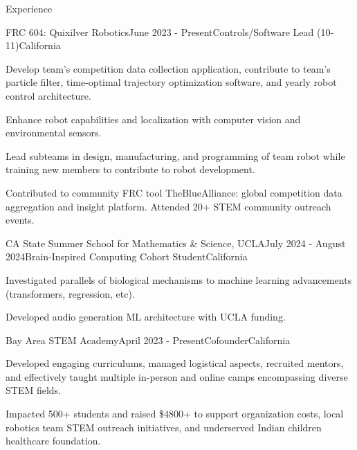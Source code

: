 \documentclass[
  11pt, %
]{public/resume/resume} %
\begin{document}
\sloppy


\begin{rSection}{Experience}


  \begin{rSubsection}{FRC 604: Quixilver Robotics}{June 2023 - Present}{Controls/Software Lead (10-11)}{California}
    
    \item Develop team's competition data collection application, contribute to team's particle filter, time-optimal trajectory optimization software, and yearly robot control architecture.
    
    \item Enhance robot capabilities and localization with computer vision and environmental sensors.
    
    \item Lead subteams in design, manufacturing, and programming of team robot while training new members to contribute to robot development.
    
    \item Contributed to community FRC tool TheBlueAlliance: global competition data aggregation and insight platform. Attended 20+ STEM community outreach events.
    
  \end{rSubsection}
        
  \begin{rSubsection}{CA State Summer School for Mathematics \& Science, UCLA}{July 2024 - August 2024}{Brain-Inspired Computing Cohort Student}{California}
    
    \item Investigated parallels of biological mechanisms to machine learning advancements (transformers, regression, etc).
    
    \item Developed audio generation ML architecture with UCLA funding.
    
  \end{rSubsection}
        
  \begin{rSubsection}{Bay Area STEM Academy}{April 2023 - Present}{Cofounder}{California}
    
    \item Developed engaging curriculums, managed logistical aspects, recruited mentors, and effectively taught multiple in-person and online camps encompassing diverse STEM fields.
    
    \item Impacted 500+ students and raised \$4800+ to support organization costs, local robotics team STEM outreach initiatives, and underserved Indian children healthcare foundation.
    
  \end{rSubsection}
        
	
\end{rSection}
\end{document}
